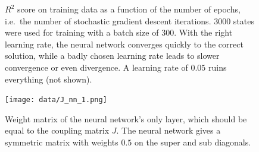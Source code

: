 \documentclass[11pt,british,a4paper]{article}
\numberwithin{equation}{section}
\begin{document}
\begin{figure}[H]
    \centering
    \caption{\(R^2\) score on training data as a function of the number of epochs, i.e.\ the number of stochastic gradient descent iterations. \(\num{3000}\) states were used for training with a batch size of \(300\). With the right learning rate, the neural network converges quickly to the correct solution, while a badly chosen learning rate leads to slower convergence or even divergence. A learning rate of \(\num{0.05}\) ruins everything (not shown).}\label{fig:r2nn}
\end{figure}

\begin{figure}[H]
    \centering
    \texttt{[image: data/J\_nn\_1.png]}
    \caption{Weight matrix of the neural network's only layer, which should be equal to the coupling matrix \(J\). The neural network gives a symmetric matrix with weights \(\num{0.5}\) on the super and sub diagonals.}
\end{figure}
\end{document}
